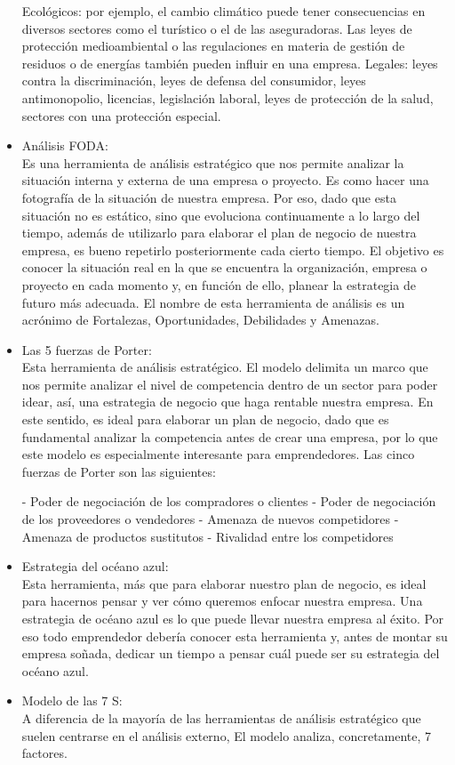 \documentclass[%
 reprint,
 amsmath,amssymb,
 aps,
]{revtex4-1}
\begin{document}
\begin{itemize}
Ecológicos: por ejemplo, el cambio climático puede tener consecuencias en diversos sectores como el turístico o el de las aseguradoras. Las leyes de protección medioambiental o las regulaciones en materia de gestión de residuos o de energías también pueden influir en una empresa.
Legales: leyes contra la discriminación, leyes de defensa del consumidor, leyes antimonopolio, licencias, legislación laboral, leyes de protección de la salud, sectores con una protección especial.
\item Análisis FODA:
\\Es una herramienta de análisis estratégico que nos permite analizar la situación interna y externa de una empresa o proyecto. Es como hacer una fotografía de la situación de nuestra empresa. Por eso, dado que esta situación no es estático, sino que evoluciona continuamente a lo largo del tiempo, además de utilizarlo para elaborar el plan de negocio de nuestra empresa, es bueno repetirlo posteriormente cada cierto tiempo. El objetivo es conocer la situación real en la que se encuentra la organización, empresa o proyecto en cada momento y, en función de ello, planear la estrategia de futuro más adecuada. El nombre de esta herramienta de análisis es un acrónimo de Fortalezas, Oportunidades, Debilidades y Amenazas. 

\item Las 5 fuerzas de Porter:\\
Esta herramienta de análisis estratégico. El modelo delimita un marco que nos permite analizar el nivel de competencia dentro de un sector para poder idear, así, una estrategia de negocio que haga rentable nuestra empresa. En este sentido, es ideal para elaborar un plan de negocio, dado que es fundamental analizar la competencia antes de crear una empresa, por lo que este modelo es especialmente interesante para emprendedores. Las cinco fuerzas de Porter son las siguientes:

- Poder de negociación de los compradores o clientes
- Poder de negociación de los proveedores o vendedores
- Amenaza de nuevos competidores
- Amenaza de productos sustitutos
- Rivalidad entre los competidores

\item Estrategia del océano azul:\\
Esta herramienta, más que para elaborar nuestro plan de negocio, es ideal para hacernos pensar y ver cómo queremos enfocar nuestra empresa. Una estrategia de océano azul es lo que puede llevar nuestra empresa al éxito. Por eso todo emprendedor debería conocer esta herramienta y, antes de montar su empresa soñada, dedicar un tiempo a pensar cuál puede ser su estrategia del océano azul.	
\item Modelo de las 7 S:
\\A diferencia de la mayoría de las herramientas de análisis estratégico que suelen centrarse en el análisis externo, El modelo analiza, concretamente, 7 factores.


\end{itemize}
\end{document}
